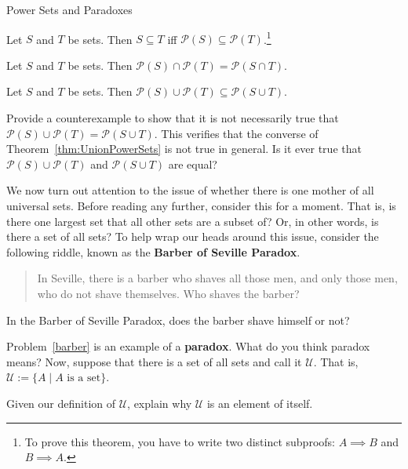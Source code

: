 \begin{section}{Power Sets and Paradoxes}
\begin{theorem}
Let $S$ and $T$ be sets.  Then $S\subseteq T$ iff $\mathcal{P}(S)\subseteq \mathcal{P}(T)$.\footnote{To prove this theorem, you have to write two distinct subproofs: $A\implies B$ and $B\implies A$.}
\end{theorem}

\begin{theorem}
Let $S$ and $T$ be sets.  Then $\mathcal{P}(S)\cap\mathcal{P}(T)=\mathcal{P}(S\cap T)$.
\end{theorem}

\begin{theorem}\label{thm:UnionPowerSets}
Let $S$ and $T$ be sets.  Then $\mathcal{P}(S)\cup\mathcal{P}(T)\subseteq \mathcal{P}(S\cup T)$.
\end{theorem}

\begin{problem}
Provide a counterexample to show that it is not necessarily true that $\mathcal{P}(S)\cup\mathcal{P}(T)= \mathcal{P}(S\cup T)$. This verifies that the converse of Theorem~\ref{thm:UnionPowerSets} is not true in general. Is it ever true that $\mathcal{P}(S)\cup\mathcal{P}(T)$ and  $\mathcal{P}(S\cup T)$ are equal?
\end{problem}

We now turn out attention to the issue of whether there is one mother of all universal sets.  Before reading any further, consider this for a moment.  That is, is there one largest set that all other sets are a subset of?  Or, in other words, is there a set of all sets?  To help wrap our heads around this issue, consider the following riddle, known as the \textbf{Barber of Seville Paradox}.

\begin{quote}
In Seville, there is a barber who shaves all those men, and only those men, who do not shave themselves.  Who shaves the barber?
\end{quote}

\begin{problem}\label{barber}
In the Barber of Seville Paradox, does the barber shave himself or not?
\end{problem}

Problem~\ref{barber} is an example of a \textbf{paradox}.  What do you think paradox means?  Now, suppose that there is a set of all sets and call it $\mathcal{U}$.  That is, $\mathcal{U}:=\{A\mid A\mbox{ is a set}\}$.

\begin{problem}
Given our definition of $\mathcal{U}$, explain why $\mathcal{U}$ is an element of itself.
\end{problem}


\end{section}
